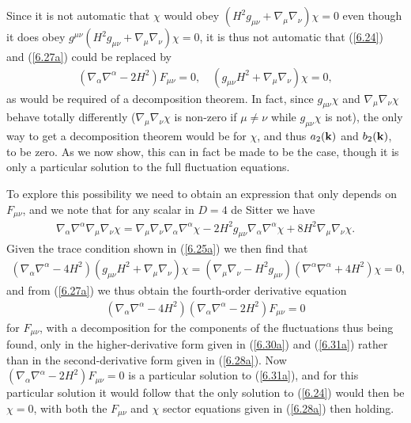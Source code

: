 Since it is not automatic that $\chi$ would obey $(H^2g_{\mu\nu}+\nabla_{\mu}\nabla_{\nu})\chi=0$ even though it does obey  $g^{\mu\nu}(H^2g_{\mu\nu}+\nabla_{\mu}\nabla_{\nu})\chi=0$, it is thus not automatic that (\ref{6.24}) and (\ref{6.27a}) could be replaced by
%
\begin{eqnarray}
(\nabla_{\alpha}\nabla^{\alpha}-2H^2)F_{\mu\nu}=0,\quad (g_{\mu\nu}H^2+\nabla_{\mu}\nabla_{\nu})\chi=0,
\label{6.28a}
\end{eqnarray}
%
as would be required of a decomposition theorem. In fact, since $g_{\mu\nu}\chi$ and $\nabla_{\mu}\nabla_{\nu}\chi$ behave totally differently ($\nabla_{\mu}\nabla_{\nu}\chi$ is non-zero if $\mu\neq \nu$ while $g_{\mu\nu}\chi$ is not), the only way to get a decomposition theorem would be for $\chi$, and thus $a_2({\bf k})$ and $b_2({\bf k})$,  to be zero. As we now show, this can in fact be made to be the case, though it is only a particular solution to the full fluctuation equations.

To explore this possibility we need to obtain an expression that  only depends on $F_{\mu\nu}$, and we note that for any scalar in  $D=4$ de Sitter we  have \cite{mannheim_2012}
%
\begin{eqnarray}
\nabla_{\alpha}\nabla^{\alpha}\nabla_{\mu}\nabla_{\nu}\chi=\nabla_{\mu}\nabla_{\nu}\nabla_{\alpha}\nabla^{\alpha}\chi
-2H^2g_{\mu\nu}\nabla_{\alpha}\nabla^{\alpha}\chi
+8H^2\nabla_{\mu}\nabla_{\nu}\chi.
\label{6.29a}
\end{eqnarray}
% 
Given the trace condition shown in (\ref{6.25a})  we then find that
%
\begin{eqnarray}
(\nabla_{\alpha}\nabla^{\alpha}-4H^2)(g_{\mu\nu}H^2+\nabla_{\mu}\nabla_{\nu})\chi
=(\nabla_{\mu}\nabla_{\nu}-H^2g_{\mu\nu})(\nabla^{\alpha}\nabla^{\alpha}+4H^2)\chi=0,
\label{6.30a}
\end{eqnarray}
%
and from (\ref{6.27a}) we thus obtain the fourth-order derivative equation
%
\begin{eqnarray}
(\nabla_{\alpha}\nabla^{\alpha}-4H^2)(\nabla_{\alpha}\nabla^{\alpha}-2H^2)F_{\mu\nu}=0
\label{6.31a}
\end{eqnarray}
%
for $F_{\mu\nu}$, with a decomposition for the components of the fluctuations thus being found, only in the higher-derivative form given in (\ref{6.30a}) and (\ref{6.31a}) rather than in the second-derivative form given in (\ref{6.28a}). Now $(\nabla_{\alpha}\nabla^{\alpha}-2H^2)F_{\mu\nu}=0$ is a particular solution to (\ref{6.31a}), and for this particular solution it would follow that the only solution to (\ref{6.24}) would then be $\chi=0$, with both the $F_{\mu\nu}$ and $\chi$ sector equations given in  (\ref{6.28a}) then holding.

